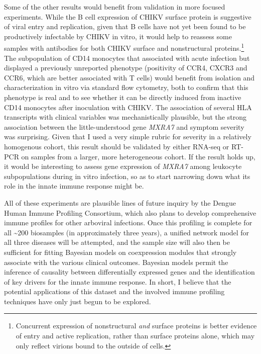 Some of the other results would benefit from validation in more focused experiments. While the B cell expression of CHIKV surface protein is suggestive of viral entry and replication, given that B cells have not yet been found to be productively infectable by CHIKV in vitro,\autocite{Her2010,Sourisseau2007,Teng2012a} it would help to reassess some samples with antibodies for both CHIKV surface and nonstructural proteins.\footnote{Concurrent expression of nonstructural \emph{and} surface proteins is better evidence of entry and active replication, rather than surface proteins alone, which may only reflect virions bound to the outside of cells.} The subpopulation of CD14\sups{+} monocytes that associated with acute infection but displayed a previously unreported phenotype (positivity of CCR4, CXCR3 and CCR6, which are better associated with T cells) would benefit from isolation and characterization in vitro via standard flow cytometry, both to confirm that this phenotype is real and to see whether it can be directly induced from inactive CD14\sups{+} monocytes after inoculation with CHIKV. The association of several HLA transcripts with clinical variables was mechanistically plausible, but the strong association between the little-understood gene \emph{MXRA7} and symptom severity was surprising. Given that I used a very simple rubric for severity in a relatively homogenous cohort, this result should be validated by either RNA-seq or RT-PCR on samples from a larger, more heterogeneous cohort. If the result holds up, it would be interesting to assess gene expression of \emph{MXRA7} among leukocyte subpopulations during in vitro infection, so as to start narrowing down what its role in the innate immune response might be.

All of these experiments are plausible lines of future inquiry by the Dengue Human Immune Profiling Consortium, which also plans to develop comprehensive immune profiles for other arboviral infections. Once this profiling is complete for all \textasciitilde 200 biosamples (in approximately three years), a unified network model for all three diseases will be attempted, and the sample size will also then be sufficient for fitting Bayesian models on coexpression modules that strongly associate with the various clinical outcomes. Bayesian models permit the inference of causality between differentially expressed genes and the identification of key drivers for the innate immune response. In short, I believe that the potential applications of this dataset and the involved immune profiling techniques have only just begun to be explored.

